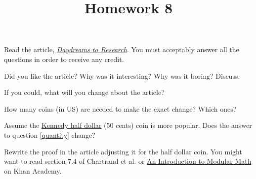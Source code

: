 \documentclass{homework}
\title{Homework 8}
\begin{document}
 \maketitle

Read the article, \textit{\href{https://tashfeen.org/blog/daydreams_to_research.md}{Daydreams to Research}}. You must acceptably answer all the questions in order to receive any credit.

\question Did you like the article? Why was it interesting? Why was it boring? Discuss.

\question If you could, what will you change about the article?

\question\label{quantity} How many coins (in US) are needed to make the exact change? Which ones?

\question Assume the \href{https://www.usmint.gov/coins/coin-medal-programs/circulating-coins/half-dollar}{Kennedy half dollar} (50 cents) coin is more popular. Does the answer to question \ref{quantity} change?

\question Rewrite the proof in the article adjusting it for the half dollar coin. You might want to read section 7.4 of Chartrand et al. or \href{https://www.khanacademy.org/computing/computer-science/cryptography/modarithmetic/a/what-is-modular-arithmetic}{An Introduction to Modular Math} on Khan Academy.
\end{document}
